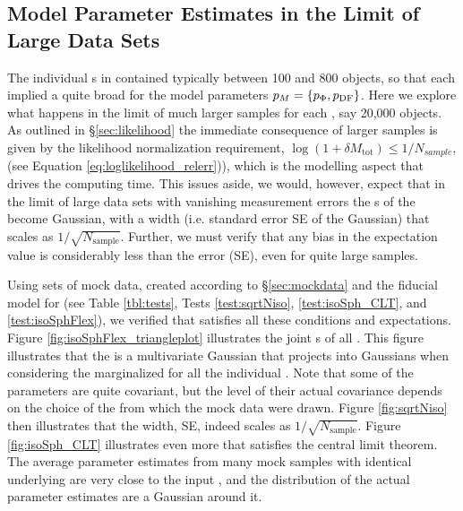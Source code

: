 \subsection{Model Parameter Estimates in the Limit of Large Data Sets} \label{sec:largedata}

The individual \MAP{}s in \citet{2013ApJ...779..115B} contained typically between 100 and 800 objects, so that each \MAP{} implied a quite broad \pdf{} for the model parameters $p_M{}=\{p_\Phi,p_\text{DF}\}$. Here we explore what happens in the limit of much larger samples for each \MAP{}, say 20,000 objects. As outlined in \S\ref{sec:likelihood} the immediate consequence of larger samples is given by the likelihood normalization requirement, $\log(1+\delta M_\text{tot})\le 1/N_{sample}$, (see Equation \ref{eq:loglikelihood_relerr})), which is the modelling aspect that drives the computing time. This issues aside, we would, however, expect that in the limit of large data sets with vanishing measurement errors the \pdf{}s of the \pmodel{} become Gaussian, with a \pdf{} width (i.e. standard error SE of the Gaussian) that scales as $1/\sqrt{N_\text{sample}}$. Further, we must verify that any bias in the \pdf{} expectation value is considerably less than the error (SE), even for quite large samples.

Using sets of mock data, created according to \S\ref{sec:mockdata} and the fiducial model for \pmodel{} (see Table \ref{tbl:tests}, Tests \ref{test:sqrtNiso}, \ref{test:isoSph_CLT}, and \ref{test:isoSphFlex}), we verified that \RM{} satisfies all these conditions and expectations. Figure \ref{fig:isoSphFlex_triangleplot} illustrates the joint \pdf{}s of all \pmodel{}. This figure illustrates that the \pdf{} is a multivariate Gaussian that projects into Gaussians when considering the marginalized \pdf{} for all the individual \pmodel{}. Note that some of the parameters are quite covariant, but the level of their actual covariance depends on the choice of the \pmodel{} from which the mock data were drawn. Figure \ref{fig:sqrtNiso} then illustrates that the \pdf{} width, SE, indeed scales as $1/\sqrt{N_\text{sample}}$. Figure \ref{fig:isoSph_CLT} illustrates even more that \RM{} satisfies the central limit theorem. The average parameter estimates from many mock samples with identical underlying \pmodel{} are very close to the input \pmodel{}, and the distribution of the actual parameter estimates are a Gaussian around it. 


